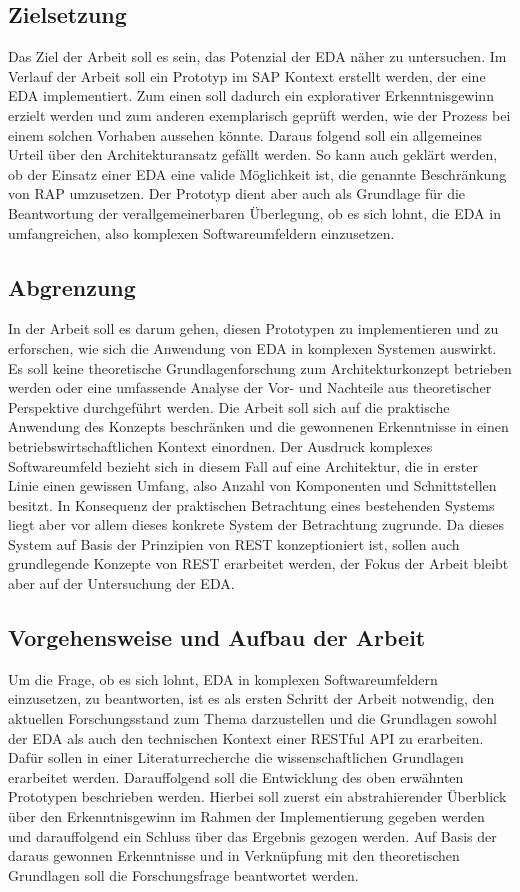 \subsection{Zielsetzung}
Das Ziel der Arbeit soll es sein, das Potenzial der \acl{EDA} näher zu untersuchen. Im Verlauf der Arbeit soll ein Prototyp im SAP Kontext erstellt werden, der eine \ac{EDA} implementiert. Zum einen soll dadurch ein explorativer Erkenntnisgewinn erzielt werden und zum anderen exemplarisch geprüft werden, wie der Prozess bei einem solchen Vorhaben aussehen könnte. Daraus folgend soll ein allgemeines Urteil über den Architekturansatz gefällt werden. So kann auch geklärt werden, ob der Einsatz einer \ac{EDA} eine valide Möglichkeit ist, die genannte Beschränkung von RAP umzusetzen. Der Prototyp dient aber auch als Grundlage für die Beantwortung der verallgemeinerbaren Überlegung, ob es sich lohnt, die \ac{EDA} in umfangreichen, also komplexen Softwareumfeldern einzusetzen.

\subsection{Abgrenzung}
In der Arbeit soll es darum gehen, diesen Prototypen zu implementieren und zu erforschen, wie sich die Anwendung von \ac{EDA} in komplexen Systemen auswirkt. Es soll keine theoretische Grundlagenforschung zum Architekturkonzept betrieben werden oder eine umfassende Analyse der Vor- und Nachteile aus theoretischer Perspektive durchgeführt werden. Die Arbeit soll sich auf die praktische Anwendung des Konzepts beschränken und die gewonnenen Erkenntnisse in einen betriebswirtschaftlichen Kontext einordnen. Der Ausdruck komplexes Softwareumfeld bezieht sich in diesem Fall auf eine Architektur, die in erster Linie einen gewissen Umfang, also Anzahl von Komponenten und Schnittstellen besitzt. In Konsequenz der praktischen Betrachtung eines bestehenden Systems liegt aber vor allem dieses konkrete System der Betrachtung zugrunde. Da dieses System auf Basis der Prinzipien von REST konzeptioniert ist, sollen auch grundlegende Konzepte von \ac{REST} erarbeitet werden, der Fokus der Arbeit bleibt aber auf der Untersuchung der \ac{EDA}.

\subsection{Vorgehensweise und Aufbau der Arbeit}
Um die Frage, ob es sich lohnt, \ac{EDA} in komplexen Softwareumfeldern einzusetzen, zu beantworten, ist es als ersten Schritt der Arbeit notwendig, den aktuellen Forschungsstand zum Thema darzustellen und die Grundlagen sowohl der \ac{EDA} als auch den technischen Kontext einer RESTful API zu erarbeiten. Dafür sollen in einer Literaturrecherche die wissenschaftlichen Grundlagen erarbeitet werden. Darauffolgend soll die Entwicklung des oben erwähnten Prototypen beschrieben werden. Hierbei soll zuerst ein abstrahierender Überblick über den Erkenntnisgewinn im Rahmen der Implementierung gegeben werden und darauffolgend ein Schluss über das Ergebnis gezogen werden. Auf Basis der daraus gewonnen Erkenntnisse und in Verknüpfung mit den theoretischen Grundlagen soll die Forschungsfrage beantwortet werden. 